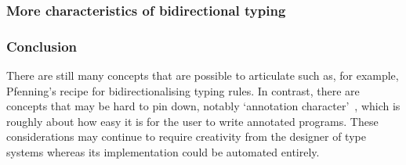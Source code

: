 \subsubsection{More characteristics of bidirectional typing}

\subsubsection{Conclusion}
There are still many concepts that are possible to articulate such as, for example, Pfenning's recipe for bidirectionalising typing rules.
In contrast, there are concepts that may be hard to pin down, notably `annotation character'~\cite{Dunfield2021}, which is roughly about how easy it is for the user to write annotated programs.
These considerations may continue to require creativity from the designer of type systems whereas its implementation could be automated entirely.
